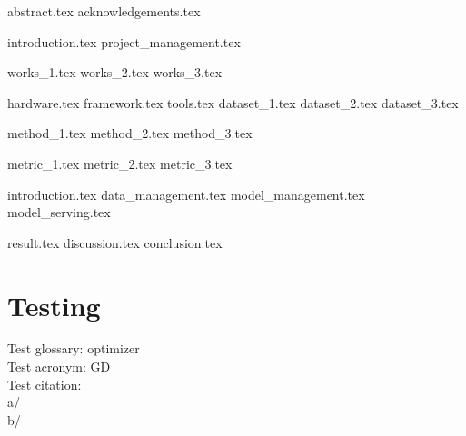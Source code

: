 \documentclass[twoside,a4paper]{report}
\begin{document}
\titlePage
\tableofcontents
\newpage

{abstract.tex}\newpage
{acknowledgements.tex}\newpage

\listoffigures
\newpage

\listoftables
\newpage

{introduction.tex}\newpage
{project_management.tex}\newpage

{works_1.tex}\newpage
{works_2.tex}\newpage
{works_3.tex}\newpage

{hardware.tex}\newpage
{framework.tex}\newpage
{tools.tex}\newpage
{dataset_1.tex}\newpage
{dataset_2.tex}\newpage
{dataset_3.tex}\newpage

{method_1.tex}\newpage
{method_2.tex}\newpage
{method_3.tex}\newpage

{metric_1.tex}\newpage
{metric_2.tex}\newpage
{metric_3.tex}\newpage

{introduction.tex}\newpage
{data_management.tex}\newpage
{model_management.tex}\newpage
{model_serving.tex}\newpage

{result.tex}\newpage
{discussion.tex}\newpage
{conclusion.tex}\newpage

\section{Testing}
Test glossary: \gls{optimizer}\\
Test acronym: \gls{GD}\\
Test citation:\\
a/ \cite{einstein}\\
b/ \cite{dirac}

\printglossary[title=Acronym,type=\acronymtype]

\printglossary[title=Glossary]

\printbibliography[title={References}]
\end{document}
